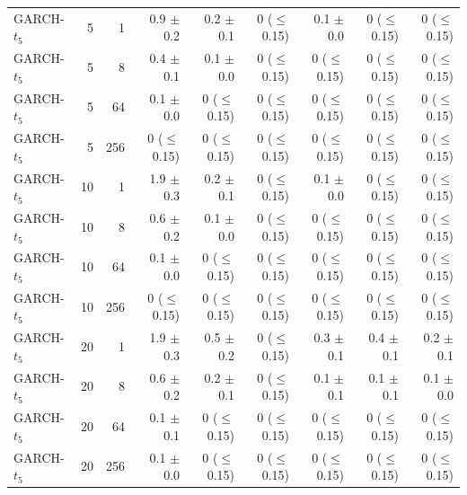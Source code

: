 \begin{table}[H]
\begin{tabular}{lrrrrrrrr}
\midrule
GARCH-$t_5$ & 5 & 1 & 0.9 $\pm$ 0.2 & 0.2 $\pm$ 0.1 & 0 ($\le$ 0.15) & 0.1 $\pm$ 0.0 & 0 ($\le$ 0.15) & 0 ($\le$ 0.15) \\
GARCH-$t_5$ & 5 & 8 & 0.4 $\pm$ 0.1 & 0.1 $\pm$ 0.0 & 0 ($\le$ 0.15) & 0 ($\le$ 0.15) & 0 ($\le$ 0.15) & 0 ($\le$ 0.15) \\
GARCH-$t_5$ & 5 & 64 & 0.1 $\pm$ 0.0 & 0 ($\le$ 0.15) & 0 ($\le$ 0.15) & 0 ($\le$ 0.15) & 0 ($\le$ 0.15) & 0 ($\le$ 0.15) \\
GARCH-$t_5$ & 5 & 256 & 0 ($\le$ 0.15) & 0 ($\le$ 0.15) & 0 ($\le$ 0.15) & 0 ($\le$ 0.15) & 0 ($\le$ 0.15) & 0 ($\le$ 0.15) \\
\midrule
GARCH-$t_5$ & 10 & 1 & 1.9 $\pm$ 0.3 & 0.2 $\pm$ 0.1 & 0 ($\le$ 0.15) & 0.1 $\pm$ 0.0 & 0 ($\le$ 0.15) & 0 ($\le$ 0.15) \\
GARCH-$t_5$ & 10 & 8 & 0.6 $\pm$ 0.2 & 0.1 $\pm$ 0.0 & 0 ($\le$ 0.15) & 0 ($\le$ 0.15) & 0 ($\le$ 0.15) & 0 ($\le$ 0.15) \\
GARCH-$t_5$ & 10 & 64 & 0.1 $\pm$ 0.0 & 0 ($\le$ 0.15) & 0 ($\le$ 0.15) & 0 ($\le$ 0.15) & 0 ($\le$ 0.15) & 0 ($\le$ 0.15) \\
GARCH-$t_5$ & 10 & 256 & 0 ($\le$ 0.15) & 0 ($\le$ 0.15) & 0 ($\le$ 0.15) & 0 ($\le$ 0.15) & 0 ($\le$ 0.15) & 0 ($\le$ 0.15) \\
\midrule
GARCH-$t_5$ & 20 & 1 & 1.9 $\pm$ 0.3 & 0.5 $\pm$ 0.2 & 0 ($\le$ 0.15) & 0.3 $\pm$ 0.1 & 0.4 $\pm$ 0.1 & 0.2 $\pm$ 0.1 \\
GARCH-$t_5$ & 20 & 8 & 0.6 $\pm$ 0.2 & 0.2 $\pm$ 0.1 & 0 ($\le$ 0.15) & 0.1 $\pm$ 0.1 & 0.1 $\pm$ 0.1 & 0.1 $\pm$ 0.0 \\
GARCH-$t_5$ & 20 & 64 & 0.1 $\pm$ 0.1 & 0 ($\le$ 0.15) & 0 ($\le$ 0.15) & 0 ($\le$ 0.15) & 0 ($\le$ 0.15) & 0 ($\le$ 0.15) \\
GARCH-$t_5$ & 20 & 256 & 0.1 $\pm$ 0.0 & 0 ($\le$ 0.15) & 0 ($\le$ 0.15) & 0 ($\le$ 0.15) & 0 ($\le$ 0.15) & 0 ($\le$ 0.15) \\
\bottomrule
\end{tabular}
\end{table}
